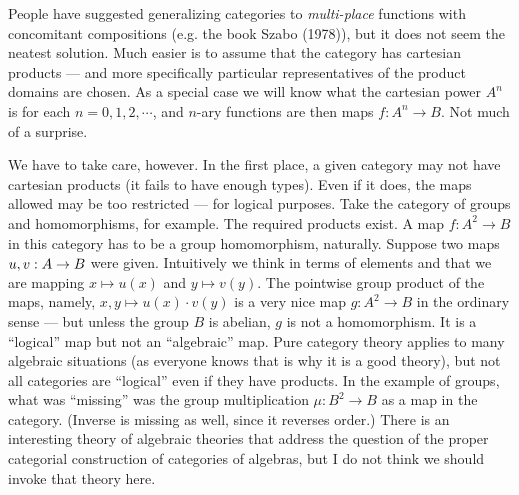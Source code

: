 People have suggested generalizing categories to {\it multi-place} functions with concomitant compositions (e.g. the book Szabo (1978)), but it does not seem the neatest solution. Much easier is to assume that the category has cartesian products --- and more specifically particular representatives of the product
domains are chosen. As a special case we will know what the cartesian power $A^n$ is for each $n=0,1,2,\cdots$, and $n$-ary functions
are then maps $f: A^n\to B$. Not much of a surprise.

We have to take care, however. In the first place, a given category may not have cartesian products (it fails to have enough types). Even if it does, the maps allowed may be too restricted --- for logical purposes. Take the category of groups and homomorphisms, for example. The required products exist.
A map $f : A^2 \to B$ in this category has to be a group homomorphism, naturally. Suppose two maps $u,v: A \rightarrow B$ were given.
Intuitively we think in terms of elements and that we are mapping $x \mapsto u(x)$ and $y \mapsto v(y)$. The pointwise group product of the maps, namely, $x,y \mapsto  u(x) \cdot v(y)$ is a very nice map $g : A^2 \to B$ in the ordinary sense --- but unless the group $B$ is abelian, $g$ is not a homomorphism. It is a ``logical'' map but not an ``algebraic'' map. Pure category theory applies to many algebraic situations (as everyone knows that is why it is a good theory), but not all categories are ``logical'' even if they have products. In the example of groups, what was ``missing'' was the group
multiplication $\mu: B^2 \to B$ as a map in the category. (Inverse is missing as well, since it reverses order.) There is an interesting theory of algebraic theories that address the question of the proper categorial construction of categories of algebras, but I do not think we should invoke that theory here.

